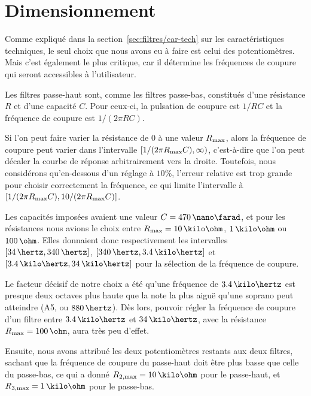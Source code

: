 \section{Dimensionnement}
\label{sec:filtres/dimens}

Comme expliqué dans la section~\ref{sec:filtres/car-tech}
sur les caractéristiques techniques,
le seul choix que nous avons eu à faire est celui des potentiomètres.
Mais c'est également le plus critique, car
il détermine les fréquences de coupure qui seront accessibles à l'utilisateur.

Les filtres passe-haut sont, comme les filtres passe-bas,
constitués d'une résistance $R$ et d'une capacité $C$. Pour ceux-ci,
la pulsation de coupure est $1/RC$
et la fréquence de coupure est $1/(2\pi RC)$.

Si l'on peut faire varier la résistance de $0$ à une valeur $R_{\mathrm{max}}$,
alors la fréquence de coupure peut varier dans l'intervalle
$[1/(2\pi R_{\mathrm{max}}C),\infty)$,
c'est-à-dire que l'on peut décaler la courbe
de réponse arbitrairement vers la droite.
Toutefois, nous considérons qu'en-dessous d'un réglage à $10\%$,
l'erreur relative est trop grande pour choisir correctement la fréquence,
ce qui limite l'intervalle à $[1/(2\pi R_{\mathrm{max}}C),10/(2\pi R_{\mathrm{max}}C)]$.

Les capacités imposées avaient une valeur $C=470\,\nano\farad$,
et pour les résistances nous avions le choix entre
$R\ind{max}=10\,\kilo\ohm$, $1\,\kilo\ohm$ ou $100\,\ohm$.
Elles donnaient donc respectivement les intervalles
$[34\,\hertz,340\,\hertz]$, $[340\,\hertz,3.4\,\kilo\hertz]$
et $[3.4\,\kilo\hertz,34\,\kilo\hertz]$
pour la sélection de la fréquence de coupure.

Le facteur décisif de notre choix a été
qu'une fréquence de $3.4\,\kilo\hertz$ est
presque deux octaves plus haute que la note la plus aiguë
qu'une soprano peut atteindre (A5, ou $880\,\hertz$).%
\cite{vocal-ranges}
Dès lors, pouvoir régler la fréquence de coupure d'un filtre
entre $3.4\,\kilo\hertz$ et $34\,\kilo\hertz$,
avec la résistance $R\ind{max} = 100\,\ohm$, aura très peu d'effet.

Ensuite, nous avons attribué les deux potentiomètres restants
aux deux filtres, sachant que la fréquence de coupure du passe-haut
doit être plus basse que celle du passe-bas,
ce qui a donné $R\ind{2,max}=10\,\kilo\ohm$ pour le passe-haut,
et $R\ind{3,max}=1\,\kilo\ohm$ pour le passe-bas.
